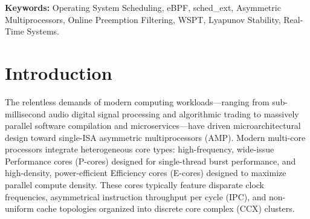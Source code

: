 \documentclass[conference]{IEEEtran}
\begin{document}
\begin{abstract}
We evaluate OPTIMA across 16 diverse workloads (pro-audio DSP, high-frequency financial order matching, game physics server, API gateway fan-out, Redis caching, microbenchmarks, IPC ping-pong, and parallel Linux kernel compilation) against CFS/EEVDF, \texttt{scx\_rusty}, and \texttt{scx\_rlfifo}. OPTIMA exhibits a bimodal performance profile: delivering an \textbf{84.1\% reduction in IPC ping-pong latency} (2.55\,$\mu$s vs 16.06\,$\mu$s on CFS) with a \textbf{6.3$\times$ throughput increase} (392,691 ops/s), a \textbf{93.6\% increase in network loopback bandwidth} (111.47 Gbps), \textbf{zero audio underruns}, \textbf{zero game desyncs}, and a \textbf{94.6\% reduction in worst-case real-time latency spikes}. Conversely, on parallel software compilation (\texttt{make kernel/}), OPTIMA takes 6.03s, matching other \texttt{sched\_ext} baselines (5.67s--5.83s) while trailing native in-kernel CFS (3.29s) due to eBPF struct-ops trampoline overhead during fork/exec process storms, and shows moderate throughput regressions (14--30\%) under high-concurrency request multiplexing (Redis, API Gateway). We present an in-depth architectural analysis characterizing these workload trade-offs and identifying the microarchitectural boundaries between specialized eBPF dispatch and in-kernel heuristics.
\end{abstract}

\vspace{1em}
\noindent\textbf{Keywords:} Operating System Scheduling, eBPF, sched\_ext, Asymmetric Multiprocessors, Online Preemption Filtering, WSPT, Lyapunov Stability, Real-Time Systems.
\vspace{1em}

\section{Introduction}
\label{sec:intro}

The relentless demands of modern computing workloads---ranging from sub-millisecond audio digital signal processing and algorithmic trading to massively parallel software compilation and microservices---have driven microarchitectural design toward single-ISA asymmetric multiprocessors (AMP). Modern multi-core processors integrate heterogeneous core types: high-frequency, wide-issue Performance cores (P-cores) designed for single-thread burst performance, and high-density, power-efficient Efficiency cores (E-cores) designed to maximize parallel compute density. These cores typically feature disparate clock frequencies, asymmetrical instruction throughput per cycle (IPC), and non-uniform cache topologies organized into discrete core complex (CCX) clusters.
\end{document}
